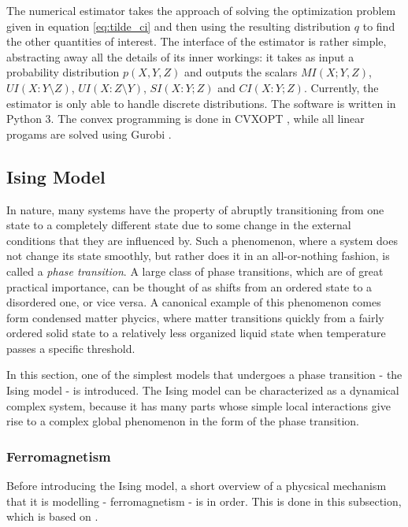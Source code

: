 \documentclass[12pt]{article}
\begin{document}
The numerical estimator takes the approach of solving the optimization problem given in equation \ref{eq:tilde_ci} and then using the resulting distribution $q$ to find the other quantities of interest. The interface of the estimator is rather simple, abstracting away all the details of its inner workings: it takes as input a  probability distribution $p(X, Y, Z)$ and outputs the scalars $MI(X;Y,Z)$, $UI(X:Y \setminus Z)$, $UI(X:Z \setminus Y)$, $SI(X:Y;Z)$ and $CI(X:Y;Z)$. Currently, the estimator is only able to handle discrete distributions. The software is written in Python 3. The convex programming is done in CVXOPT \cite{cvxopt}, while all linear progams are solved using Gurobi \cite{gurobi}. 

\subsection{Ising Model}

In nature, many systems have the property of abruptly transitioning from one state to a completely different state due to some change in the external conditions that they are influenced by. Such a phenomenon, where a system does not change its state smoothly, but rather does it in an all-or-nothing fashion, is called a \textit{phase transition}. A large class of phase transitions, which are of great practical importance, can be thought of as shifts from an ordered state to a disordered one, or vice versa. A canonical example of this phenomenon comes form condensed matter phycics, where matter transitions quickly from a fairly ordered solid state to a relatively less organized liquid state when temperature passes a specific threshold.\cite{inf-flow-ising-commentary}

In this section, one of the simplest models that undergoes a phase transition - the Ising model - is introduced. The Ising model can be characterized as a dynamical complex system, because it has many parts whose simple local interactions give rise to a complex global phenomenon in the form of the phase transition. 

\subsubsection{Ferromagnetism}

Before introducing the Ising model, a short overview of a phycsical mechanism that it is modelling - ferromagnetism - is in order. This is done in this subsection, which is based on \cite{memory-systems-cache-ram}.
\end{document}
